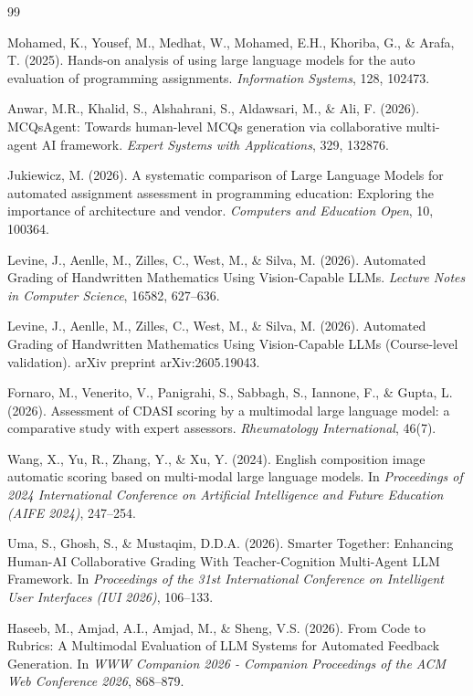 \documentclass[11pt,a4paper]{article}
\begin{document}
\begin{thebibliography}{99}

Mohamed, K., Yousef, M., Medhat, W., Mohamed, E.H., Khoriba, G., \& Arafa, T. (2025). Hands-on analysis of using large language models for the auto evaluation of programming assignments. \textit{Information Systems}, 128, 102473.

Anwar, M.R., Khalid, S., Alshahrani, S., Aldawsari, M., \& Ali, F. (2026). MCQsAgent: Towards human-level MCQs generation via collaborative multi-agent AI framework. \textit{Expert Systems with Applications}, 329, 132876.

Jukiewicz, M. (2026). A systematic comparison of Large Language Models for automated assignment assessment in programming education: Exploring the importance of architecture and vendor. \textit{Computers and Education Open}, 10, 100364.

Levine, J., Aenlle, M., Zilles, C., West, M., \& Silva, M. (2026). Automated Grading of Handwritten Mathematics Using Vision-Capable LLMs. \textit{Lecture Notes in Computer Science}, 16582, 627--636.

Levine, J., Aenlle, M., Zilles, C., West, M., \& Silva, M. (2026). Automated Grading of Handwritten Mathematics Using Vision-Capable LLMs (Course-level validation). arXiv preprint arXiv:2605.19043.

Fornaro, M., Venerito, V., Panigrahi, S., Sabbagh, S., Iannone, F., \& Gupta, L. (2026). Assessment of CDASI scoring by a multimodal large language model: a comparative study with expert assessors. \textit{Rheumatology International}, 46(7).

Wang, X., Yu, R., Zhang, Y., \& Xu, Y. (2024). English composition image automatic scoring based on multi-modal large language models. In \textit{Proceedings of 2024 International Conference on Artificial Intelligence and Future Education (AIFE 2024)}, 247--254.

Uma, S., Ghosh, S., \& Mustaqim, D.D.A. (2026). Smarter Together: Enhancing Human-AI Collaborative Grading With Teacher-Cognition Multi-Agent LLM Framework. In \textit{Proceedings of the 31st International Conference on Intelligent User Interfaces (IUI 2026)}, 106--133.

Haseeb, M., Amjad, A.I., Amjad, M., \& Sheng, V.S. (2026). From Code to Rubrics: A Multimodal Evaluation of LLM Systems for Automated Feedback Generation. In \textit{WWW Companion 2026 - Companion Proceedings of the ACM Web Conference 2026}, 868--879.


\end{thebibliography}
\end{document}
